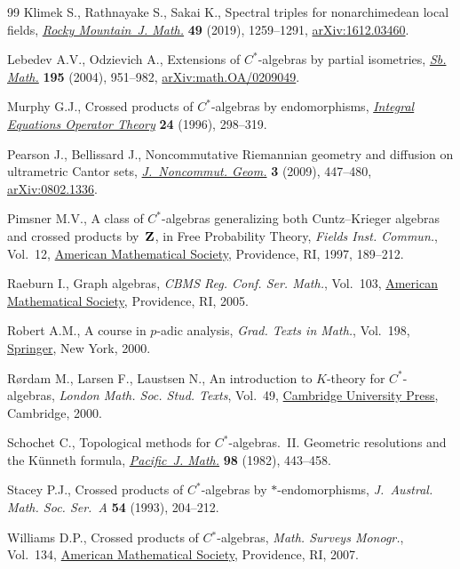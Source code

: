 \documentclass[pdftex]{sigma}
\numberwithin{equation}{section}
\begin{document}
\begin{thebibliography}{99}
Klimek S., Rathnayake S., Sakai K., Spectral triples for nonarchimedean local
 fields, \href{https://doi.org/10.1216/RMJ-2019-49-4-1259}{\textit{Rocky
 Mountain~J. Math.}} \textbf{49} (2019), 1259--1291,
 \href{http://arxiv.org/abs/1612.03460}{arXiv:1612.03460}.

Lebedev A.V., Odzievich A., Extensions of {$C^\ast$}-algebras by partial
 isometries,
 \href{https://doi.org/10.1070/SM2004v195n07ABEH000834}{\textit{Sb. Math.}}
 \textbf{195} (2004), 951--982,
 \href{http://arxiv.org/abs/math.OA/0209049}{arXiv:math.OA/0209049}.

Murphy G.J., Crossed products of {$C^*$}-algebras by endomorphisms,
 \href{https://doi.org/10.1007/BF01204603}{\textit{Integral Equations Operator
 Theory}} \textbf{24} (1996), 298--319.

Pearson J., Bellissard J., Noncommutative {R}iemannian geometry and diffusion
 on ultrametric {C}antor sets,
 \href{https://doi.org/10.4171/JNCG/43}{\textit{J.~Noncommut. Geom.}}
 \textbf{3} (2009), 447--480,
 \href{http://arxiv.org/abs/0802.1336}{arXiv:0802.1336}.

Pimsner M.V., A class of {$C^*$}-algebras generalizing both {C}untz--{K}rieger
 algebras and crossed products by~{${\bf Z}$}, in Free {P}robability {T}heory,
 \textit{Fields Inst. Commun.}, Vol.~12,
 \href{https://doi.org/10.1090/fic/012/08}{American Mathematical Society},
 Providence, RI, 1997, 189--212.

Raeburn I., Graph algebras, \textit{CBMS Reg. Conf. Ser. Math.}, Vol.~103,
 \href{https://doi.org/10.1090/cbms/103}{American Mathematical Society},
 Providence, RI, 2005.

Robert A.M., A course in {$p$}-adic analysis, \textit{Grad. Texts in Math.},
 Vol.~198, \href{https://doi.org/10.1007/978-1-4757-3254-2}{Springer}, New
 York, 2000.

R{\o}rdam M., Larsen F., Laustsen N., An introduction to {$K$}-theory for
 {$C^*$}-algebras, \textit{London Math. Soc. Stud. Texts}, Vol.~49,
 \href{https://doi.org/10.1017/CBO9780511623806}{Cambridge University Press},
 Cambridge, 2000.

Schochet C., Topological methods for {$C^{\ast} $}-algebras.~{II}. {G}eometric
 resolutions and the {K}\"unneth formula,
 \href{https://doi.org/10.2140/pjm.1982.98.443}{\textit{Pacific~J. Math.}}
 \textbf{98} (1982), 443--458.

Stacey P.J., Crossed products of {$C^\ast$}-algebras by {$\ast$}-endomorphisms,
 \textit{J.~Austral. Math. Soc. Ser.~A} \textbf{54} (1993), 204--212.

Williams D.P., Crossed products of {$C{^\ast}$}-algebras, \textit{Math. Surveys Monogr.}, Vol.~134,
 \href{https://doi.org/10.1090/surv/134}{American Mathematical Society},
 Providence, RI, 2007.

\end{thebibliography}\LastPageEnding
\end{document}
